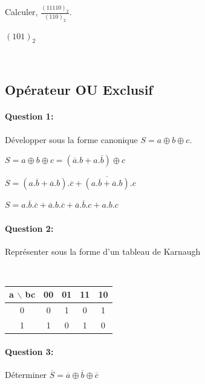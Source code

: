 Calculer, $\frac{(11110)_{2}}{(110)_{2}}$.

$(101)_{2}$

~\

\subsection{Opérateur OU Exclusif}

\paragraph{Question 1:}

Développer sous la forme canonique $S= a \oplus b \oplus c$.

$S= a \oplus b \oplus c=(\overline{a}.b+a.\overline{b}) \oplus c$

$S=(a.\overline{b}+\overline{a}.b).\overline{c}+\overline{(a.\overline{b}+\overline{a}.b)}.c$

$S=a.\overline{b}.\overline{c}+\overline{a}.b.\overline{c}+\overline{a}.\overline{b}.c+a.b.c$



\paragraph{Question 2:}

Représenter sous la forme d'un tableau de Karnaugh

~\

\begin{center}
\begin{tabular}{|c|c|c|c|c|}
\hline
a $\backslash$ bc & 00 & 01 & 11 & 10 \\
\hline
0  & 0 & 1 & 0 & 1 \\
\hline
1  & 1 & 0 & 1 & 0 \\
\hline
\end{tabular} 
\end{center}

\paragraph{Question 3:}

Déterminer $\overline{S}= \overline{a} \oplus \overline{b} \oplus \overline{c}$



